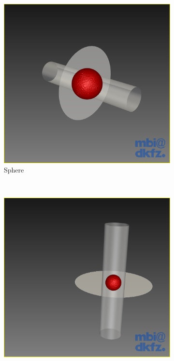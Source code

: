 \begin{figure}[H]
  \centering
  \begin{subfigure}[b]{0.5\textwidth}
    \includegraphics[width=\textwidth]{images/next_scan_plane/sphere.png}
    \caption{Sphere}
    \label{fig:nextscanplanesphere}
  \end{subfigure}%
  ~ %
  \begin{subfigure}[b]{0.5\textwidth}
    \includegraphics[width=\textwidth]{images/next_scan_plane/sphere_in_corner.png}

\end{subfigure}
\end{figure}
